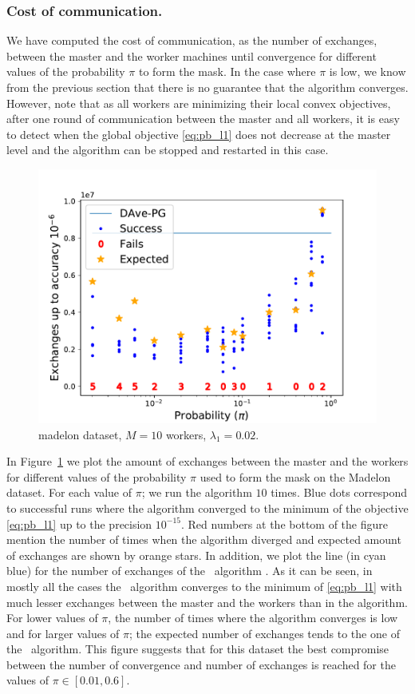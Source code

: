 \subsubsection{Cost of communication.}
We have computed the cost of communication, as the number of exchanges, between the master and the worker machines until convergence for different values of the probability $\pi$ to form the mask. In the case where $\pi$ is low, we know from the previous section that there is no guarantee that the algorithm \SP{} converges. However, note that as all workers are minimizing their local convex objectives, after one round of communication between the master and all workers, it is easy to detect when the global objective \eqref{eq:pb_l1} does not decrease at the master level and the algorithm can be stopped and restarted in this case. 
\begin{figure}[b!]
    \includegraphics[width = \linewidth]{SODA/Figs/madelon_10w_002_0001_robust.pdf}
    \caption{madelon dataset, $M=10$ workers, $\lambda_1 = 0.02$.}
    \label{fig:madelon_robust}
\end{figure} 
In Figure~\ref{fig:madelon_robust} we plot the amount of exchanges between the master and the workers for different values of the probability $\pi$ used to form the mask on the Madelon dataset. For each value of $\pi$; we run the algorithm $10$ times. Blue dots correspond to successful runs where the algorithm converged to the minimum of the objective \eqref{eq:pb_l1} up to the precision $10^{-15}$. Red numbers at the bottom of the figure mention the number of times when the algorithm diverged and expected amount of exchanges are shown by orange stars. In addition, we plot the line (in cyan blue) for the number of exchanges of the \dave~algorithm \cite{ICML18}. As it can be seen, in mostly all the cases the \SP{}~algorithm converges to the minimum of \eqref{eq:pb_l1} with much lesser exchanges between the master and the workers than in the \dave{} algorithm. For lower values of $\pi$, the number of times where the algorithm converges is low and for larger values of $\pi$; the expected number of exchanges tends to the one of the \dave~algorithm. This figure suggests that for this dataset the best compromise between the number of convergence and number of exchanges is reached for the values of $\pi\in[0.01,0.6]$. 
